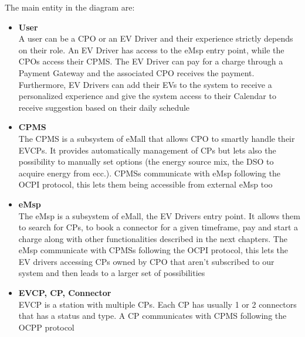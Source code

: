The main entity in the diagram are:
\begin{itemize}
      \item \textbf{User}\\
            A user can be a CPO or an EV Driver and their experience strictly depends on their role.
            An EV Driver has access to the eMsp entry point, while the CPOs access their CPMS.
            The EV Driver can pay for a charge through a Payment Gateway and the associated CPO receives the
            payment. Furthermore, EV Drivers can add their EVs to the system to receive a personalized experience and give the system access to their Calendar to receive suggestion based on their daily schedule
      \item \textbf{CPMS}\\
            The CPMS is a subsystem of eMall that allows CPO to smartly handle their EVCPs. It provides automatically management of CPs but lets also the possibility to manually set options (the energy source mix, the DSO to acquire energy from ecc.). CPMSs communicate with eMsp following the OCPI protocol, this lets them being accessible from external eMsp too
      \item \textbf{eMsp}\\
            The eMsp is a subsystem of eMall, the EV Drivers entry point. It allows them to search for CPs, to book a connector for a given timeframe, pay and start a charge along with other functionalities described in the next chapters. The eMsp communicate with CPMSs following the OCPI protocol, this lets the EV drivers accessing CPs owned by CPO that aren't subscribed to our system and then leads to a larger set of possibilities
      \item \textbf{EVCP, CP, Connector}\\
            EVCP is a station with multiple CPs. Each CP has usually 1 or 2 connectors that has a status and type. A CP communicates with CPMS following the OCPP protocol
\end{itemize}

